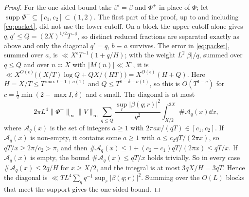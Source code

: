 \documentclass[11pt,colorlinks]{charlie}
\begin{document}
\begin{proof}
For the one-sided bound take $\beta'=\beta$ and $\Phi^+$ in place of $\Phi$; let $\operatorname{supp}\Phi^+\subseteq[c_1,c_2]\subset(1,2)$. The first part of the proof, up to and including \eqref{eq:packet}, did not use the lower cutoff. On a block the upper cutoff alone gives $q,q'\le Q=(2X)^{1/2}T^{-\delta}$, so distinct reduced fractions are separated exactly as above and only the diagonal $q'=q$, $b\equiv a$ survives. The error in \eqref{eq:packet}, summed over $a$, is $\ll X^\epsilon T^{-1}(1+q/H)$; with the weight $L^2|\beta|/q$, summed over $q\le Q$ and over $n\asymp X$ with $|M(n)|\ll X^\epsilon$, it is $\ll X^{O(\epsilon)}\big((X/T)\log Q+QX/(HT)\big)=X^{O(\epsilon)}(H+Q)$. Here $H=X/T\le T^{\max I-1+o(1)}$ and $Q\le T^{1-\delta+o(1)}$, so this is $O(T^{1-c})$ for $c=\frac12\min(2-\max I,\delta)$ and $\epsilon$ small. The diagonal is at most
\[
 2\pi L^4\|\Phi^+\|_\infty\|V\|_\infty\sum_{q\le Q}\frac{\sup_r|\beta(q;r)|^2}{q^2}\int_{X/2}^{2X}\#\mathcal A_q(x)\dd x,
\]
where $\mathcal A_q(x)$ is the set of integers $a\ge1$ with $2\pi ax/(qT)\in[c_1,c_2]$. If $\mathcal A_q(x)$ is non-empty, it contains some $a\ge1$ with $a\le c_2qT/(2\pi x)$, so $qT/x\ge2\pi/c_2>\pi$, and then $\#\mathcal A_q(x)\le1+(c_2-c_1)qT/(2\pi x)\le qT/x$. If $\mathcal A_q(x)$ is empty, the bound $\#\mathcal A_q(x)\le qT/x$ holds trivially. So in every case $\#\mathcal A_q(x)\le2q/H$ for $x\ge X/2$, and the integral is at most $3qX/H=3qT$. Hence the diagonal is $\ll TL^4\sum_qq^{-1}\sup_r|\beta(q;r)|^2$. Summing over the $O(L)$ blocks that meet the support gives the one-sided bound.
\end{proof}
\end{document}
